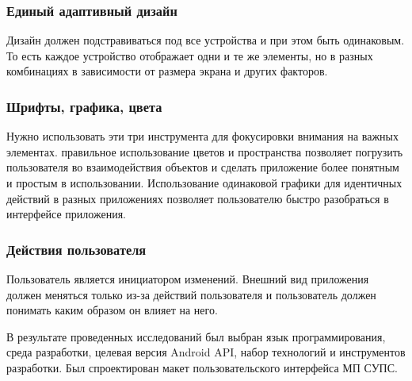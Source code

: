 \subsubsection*{Единый адаптивный дизайн}
Дизайн должен подстравиваться под все устройства и при этом быть одинаковым.
То есть каждое устройство отображает одни и те же элементы, но в разных комбинациях в зависимости от размера экрана и других факторов.

\subsubsection*{Шрифты, графика, цвета}
Нужно использовать эти три инструмента для фокусировки внимания на важных элементах.
правильное использование цветов и пространства позволяет погрузить пользователя во взаимодействия объектов и сделать приложение более понятным и простым в использовании.
Использование одинаковой графики для идентичных действий в разных приложениях позволяет пользователю быстро разобраться в интерфейсе приложения.

\subsubsection*{Действия пользователя}
Пользователь является инициатором изменений.
Внешний вид приложения должен меняться только из-за действий пользователя и пользователь должен понимать каким образом он влияет на него.

\conclusions
\label{sec:designConclusions}

В результате проведенных исследований был выбран язык программирования, среда разработки, целевая версия Android API, набор технологий и инструментов разработки.
Был спроектирован макет пользовательского интерфейса МП СУПС.
